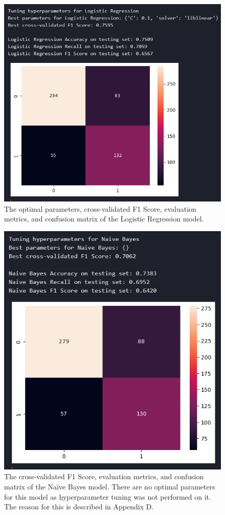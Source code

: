 \documentclass[12pt]{report}
\begin{document}
\begin{figure}[H]
    \centering
    \includegraphics[width=\linewidth]{ModelDev/Iteration2/Results/LR.png}
    \caption{The optimal parameters, cross-validated F1 Score, evaluation metrics, and confusion matrix of the Logistic Regression model.}
    \label{fig:LRIteration2}
\end{figure}

\begin{figure}[H]
    \centering
    \includegraphics[width=\linewidth]{ModelDev/Iteration2/Results/NB.png}
    \caption{The cross-validated F1 Score, evaluation metrics, and confusion matrix of the Na\"ive Bayes model. There are no optimal 
    parameters for this model as hyperparameter tuning was not performed on it. The reason for this is described in Appendix D.}
    \label{fig:NBIteration2}
\end{figure}
\end{document}
